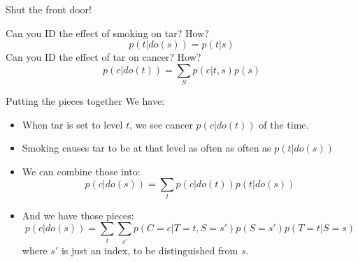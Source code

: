 \documentclass[xcolor=dvipsnames]{beamer}
\begin{document}
\begin{frame}{Shut the front door!}
\begin{figure}
        \end{figure}
\small
{} Can you ID the effect of smoking on tar? How?\\
 \[ p(t|do(s)) = p(t|s) \]
 Can you ID the effect of tar on cancer? How? \\
 \[p(c|do(t)) = \sum_{S} p(c|t,s)p(s)  \]
\end{frame}

\begin{frame}{Putting the pieces together}
\small
We have:
\begin{itemize}
\item<1-> When tar is set to level $t$,  we see cancer $p(c|do(t))$ of the time.
\item<2-> Smoking causes tar to be at that level as often as often as $p(t|do(s))$
\item<3-> We can combine those into:
\[ p(c|do(s)) = \sum_{t}  p(c|do(t))p(t|do(s)) \]
\item<4-> And we have those pieces:
 \[ p(c|do(s)) = \sum_{t} \sum_{s'} p(C=c|T=t, S=s')  p(S=s')p(T=t| S=s)  \]
\noindent where $s'$ is just an index, to be distinguished from $s$. 
\end{itemize}
\end{frame}
  
\end{document}
